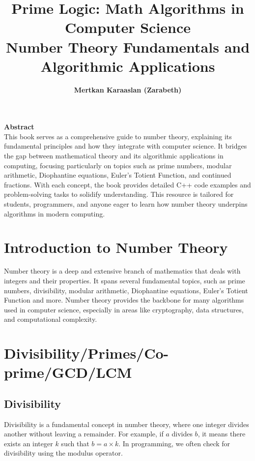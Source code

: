 \documentclass[10pt,a4paper]{article}
\title{\Huge \textbf{Prime Logic: Math Algorithms in Computer Science}\\[0.5cm]
\Large Number Theory Fundamentals and Algorithmic Applications}
\author{\textbf{Mertkan Karaaslan (Zarabeth)}}
\date{}
\begin{document}
\maketitle


\vspace{2cm}

\vfill

\begin{center}
    \textbf{Abstract}\\[0.5cm]
    This book serves as a comprehensive guide to number theory, explaining its fundamental principles and how they integrate with computer science. It bridges the gap between mathematical theory and its algorithmic applications in computing, focusing particularly on topics such as prime numbers, modular arithmetic, Diophantine equations, Euler's Totient Function, and continued fractions. With each concept, the book provides detailed C++ code examples and problem-solving tasks to solidify understanding. This resource is tailored for students, programmers, and anyone eager to learn how number theory underpins algorithms in modern computing.
\end{center}

\vfill

\newpage

\newpage
\pagestyle{fancy}
\section*{Introduction to Number Theory}

Number theory is a deep and extensive branch of mathematics that deals with integers and their properties. It spans several fundamental topics, such as prime numbers, divisibility, modular arithmetic, Diophantine equations, Euler's Totient Function and more. Number theory provides the backbone for many algorithms used in computer science, especially in areas like cryptography, data structures, and computational complexity. 

\section*{Divisibility/Primes/Co-prime/GCD/LCM}

\subsection*{Divisibility}
Divisibility is a fundamental concept in number theory, where one integer divides another without leaving a remainder. For example, if \(a\) divides \(b\), it means there exists an integer \(k\) such that \(b = a \times k\). In programming, we often check for divisibility using the modulus operator.
\end{document}
